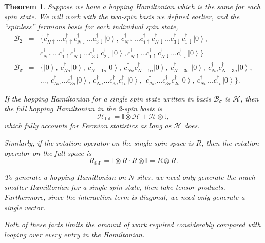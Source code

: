 \documentclass{article}
\newcommand{\ket}[1]{\left| #1 \right>} %
\newtheorem{theorem}{Theorem}[section]
\theoremstyle{definition}
\begin{document}
\begin{theorem}
Suppose we have a hopping Hamiltonian which is the same for each spin state. We will work with the two-spin basis we defined earlier, and the ``spinless'' fermions basis for each individual spin state,
\begin{eqnarray*}
\mathcal{B}_2 &=& \{ c^\dag_{N\uparrow}...c^\dag_{1\uparrow}c^\dag_{N\downarrow}...c^\dag_{3\downarrow} \ket{0},\ c^\dag_{N\uparrow}...c^\dag_{1\uparrow}c^\dag_{N\downarrow}...c^\dag_{3\downarrow} c^\dag_{1\downarrow} \ket{0}, \nonumber \\
&& c^\dag_{N\uparrow}...c^\dag_{1\uparrow}c^\dag_{N\downarrow}...c^\dag_{3\downarrow}c^\dag_{2\downarrow} \ket{0}, c^\dag_{N\uparrow}...c^\dag_{1\uparrow}c^\dag_{N\downarrow}...c^\dag_{1\downarrow} \ket{0} \} \nonumber\\
\mathcal{B}_\sigma &=& \{\ket{0}, \ c^\dag_{N\sigma} \ket{0}, \ c^\dag_{N-1\sigma} \ket{0}, \ c^\dag_{N\sigma} c^\dag_{N-1\sigma} \ket{0}, \ c^\dag_{N-3\sigma}\ \ket{0}, \ c^\dag_{N\sigma} c^\dag_{N-3\sigma} \ket{0} ,\\
&& ...,\ c^\dag_{N\sigma}...c^\dag_{3\sigma} \ket{0}, \ c^\dag_{N\sigma}...c^\dag_{3\sigma} c^\dag_{1\sigma} \ket{0},\ \ c^\dag_{N\sigma}...c^\dag_{3\sigma} c^\dag_{2\sigma} \ket{0}, \ c^\dag_{N\sigma}...c^\dag_{1\sigma} \ket{0}\} \nonumber.
\end{eqnarray*}

If the hopping Hamiltonian for a single spin state written in basis $\mathcal{B}_\sigma$ is $\mathcal{H}$, then the full hopping Hamiltonian in the 2-spin basis is
\begin{equation}
\mathcal{H}_\text{full} = \mathbb{I} \otimes \mathcal{H} + \mathcal{H} \otimes \mathbb{I},
\end{equation}
which fully accounts for Fermion statistics as long as $\mathcal{H}$ does.

Similarly, if the rotation operator on the single spin space is $R$, then the rotation operator on the full space is
\begin{equation}
R_\text{full} = \mathbb{I} \otimes R \cdot R \otimes \mathbb{I} = R \otimes R.
\end{equation}

To generate a hopping Hamiltonian on $N$ sites, we need only generate the much smaller Hamiltonian for a single spin state, then take tensor products. Furthermore, since the interaction term is diagonal, we need only generate a single vector. 

Both of these facts limits the amount of work required considerably compared with looping over every entry in the Hamiltonian.
\end{theorem}

\nocite{*}

 
\end{document}
